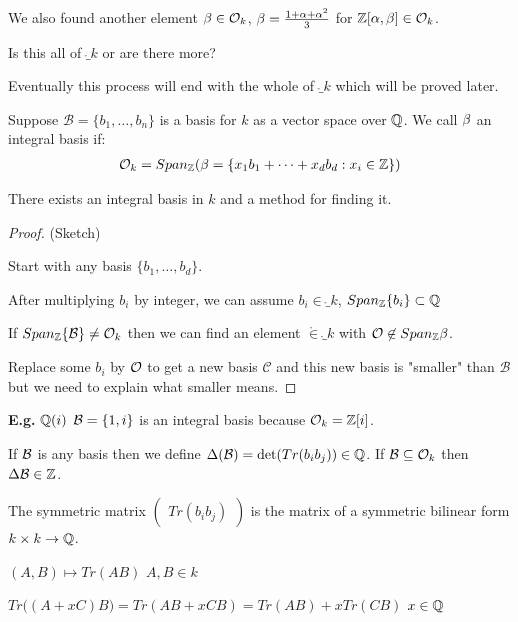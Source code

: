 \documentclass[11pt]{article}
\begin{document}
We also found another element $\beta \in \mathcal{O}_k $, $\beta = \frac{1+\alpha+\alpha^2}{3}$ for $\mathbb{Z}[\alpha, \beta] \in \mathcal{O}_k$.
\spa

Is this all of $\ring_k$ or are there more?
\spa

Eventually this process will end with the whole of $\ring_k$ which will be proved later.

\begin{defn}
	Suppose $\mathcal{B} = \{b_1, \dots, b_n \} $ is a basis for $k$ as a vector space over $\mathbb{Q}$.
	We call $\beta$ an integral basis if:
	\begin{align*}
		\mathcal{O}_k = Span_{\mathbb{Z}}(\beta = \{x_1b_1 + \dots + x_db_d: x_i \in \mathbb{Z} \})
	\end{align*}
\end{defn}
\begin{theorem}
	There exists an integral basis in $k$ and a method for finding it.
\end{theorem}

\begin{proof}
	(Sketch)

	Start with any basis $\{ b_1,\dots, b_d\}$.
	\spa

	After multiplying $b_i$ by integer, we can assume $b_i \in \ring_k$, $Span_{\mathbb{Z}}\{b_i\} \subset\mathbb{Q}$
	\spa

	If $Span_{\mathbb{Z}} \{\mathcal{B}\} \neq \mathcal{O}_k$ then we can find an element $\ring \in \ring_k$ with $\mathcal{O} \not \in Span_{\mathbb{Z}} \beta$.
	\spa

	Replace some $b_i$ by $\mathcal{O}$ to get a new basis $\mathcal{C}$ and this new basis is "smaller" than $\mathcal{B}$ but we need to explain what smaller means.
\end{proof}

\spa
\textbf{E.g.} $\mathbb{Q}(i)$ \hspace{7pt}  $ \mathcal{B} = \{1,i\}$ is an integral basis because $\mathcal{O}_k =\mathbb{Z}[i]$. 
\spa

If $\mathcal{B}$ is any basis then we define $\Delta(\mathcal{B}) = \det(Tr(b_ib_j)) \in \mathbb{Q}$.
If $\mathcal{B} \subseteq \mathcal{O}_k$ then $\Delta\mathcal{B} \in \mathbb{Z}$.
\spa

The symmetric matrix $\begin{pmatrix}
	Tr(b_ib_j)
\end{pmatrix}$
 is the matrix of a symmetric bilinear form $k \times k \rightarrow \mathbb{Q}$.
\spa
 
 $(A, B) \mapsto Tr(AB)$ \hspace{7pt} $A,B \in k$
 \spa

 $Tr\big((A+xC)B\big) = Tr(AB+xCB) = Tr(AB) + xTr(CB) $ \hspace{7pt} $ x \in \mathbb{Q}$
\end{document}
